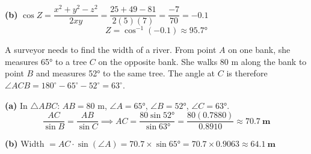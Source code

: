 \documentclass[addpoints]{exam}
\begin{document}
\begin{questions}
\begin{solution}[9cm]
\textbf{(b)} $\cos Z = \dfrac{x^2 + y^2 - z^2}{2xy} = \dfrac{25 + 49 - 81}{2(5)(7)}
= \dfrac{-7}{70} = -0.1$
\[
Z = \cos^{-1}(-0.1) \approx \mathbf{\ang{95.7}}
\]
\end{solution}

\question A surveyor needs to find the width of a river. From point $A$ on one bank,
she measures \ang{65} to a tree $C$ on the opposite bank. She walks 80 m along the
bank to point $B$ and measures \ang{52} to the same tree. The angle at $C$ is
therefore $\angle ACB = 180^\circ - 65^\circ - 52^\circ = 63^\circ$.
\begin{solution}[8cm]
\textbf{(a)} In $\triangle ABC$: $AB = 80$ m, $\angle A = \ang{65}$,
$\angle B = \ang{52}$, $\angle C = \ang{63}$.
\[
\frac{AC}{\sin B} = \frac{AB}{\sin C} \implies
AC = \frac{80\sin\ang{52}}{\sin\ang{63}} = \frac{80(0.7880)}{0.8910}
\approx \mathbf{\SI{70.7}{m}}
\]

\textbf{(b)} Width $= AC \cdot \sin(\angle A) = 70.7 \times \sin\ang{65}
= 70.7 \times 0.9063 \approx \mathbf{\SI{64.1}{m}}$
\end{solution}

\end{questions}
\end{document}
